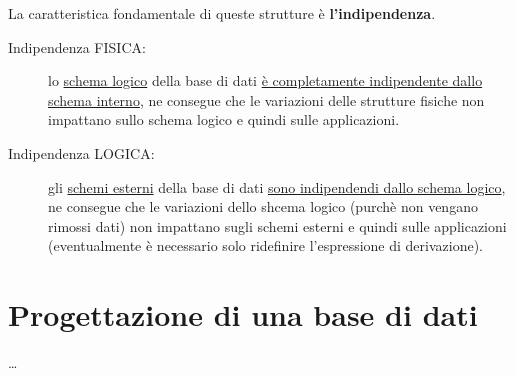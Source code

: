 \documentclass[a4paper, 12pt]{book}
\begin{document}
    
    La caratteristica fondamentale di queste strutture è \textbf{l'indipendenza}.
    \begin{description}
      \item[Indipendenza FISICA:] lo \uline{schema logico} della base di dati \uline{è completamente indipendente dallo schema interno}, ne consegue che le variazioni delle strutture fisiche non impattano sullo schema logico e quindi sulle applicazioni.
      \item[Indipendenza LOGICA:] gli \uline{schemi esterni} della base di dati \uline{sono indipendendi dallo schema logico}, ne consegue che le variazioni dello shcema logico (purchè non vengano rimossi dati) non impattano sugli schemi esterni e quindi sulle applicazioni (eventualmente è necessario solo ridefinire l'espressione di derivazione).
    \end{description}
     

    \section*{Progettazione di una base di dati}
  

    \dots
\end{document}

